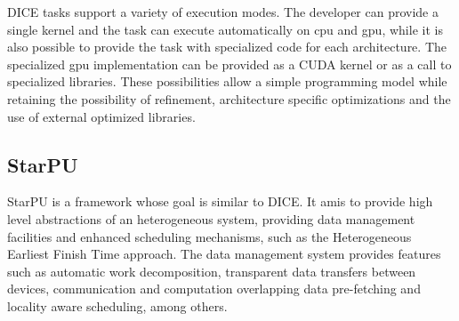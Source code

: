 DICE tasks support a variety of execution modes. The developer can provide a single kernel and the task can execute automatically on \gls{cpu} and \gls{gpu}, while it is also possible to provide the task with specialized code for each architecture. The specialized \gls{gpu} implementation can be provided as a CUDA kernel or as a call to specialized libraries. These possibilities allow a simple programming model while retaining the possibility of refinement, architecture specific optimizations and the use of external optimized libraries.

\subsection{StarPU}



StarPU \citep{augonnet2011starpu} is a framework whose goal is similar to DICE. It amis to provide high level abstractions of an heterogeneous system, providing data management facilities and enhanced scheduling mechanisms, such as the Heterogeneous Earliest Finish Time approach. The data management system provides features such as automatic work decomposition, transparent data transfers between devices, communication and computation overlapping data pre-fetching and locality aware scheduling, among others.